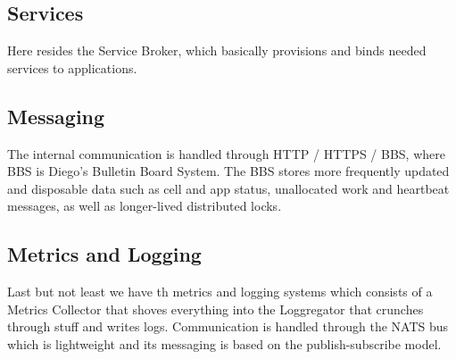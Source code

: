 \subsection{Services}
Here resides the Service Broker, which basically provisions and binds needed services to applications.
\subsection{Messaging}
The internal communication is handled through HTTP / HTTPS / BBS, where BBS is Diego's Bulletin Board System. The BBS stores more frequently updated and disposable data such as cell and app status, unallocated work and heartbeat messages, as well as longer-lived distributed locks.
\subsection{Metrics and Logging}
Last but not least we have th metrics and logging systems which consists of a Metrics Collector that shoves everything into the Loggregator that crunches through stuff and writes logs. \n
Communication is handled through the NATS bus which is lightweight and its messaging is based on the publish-subscribe model.